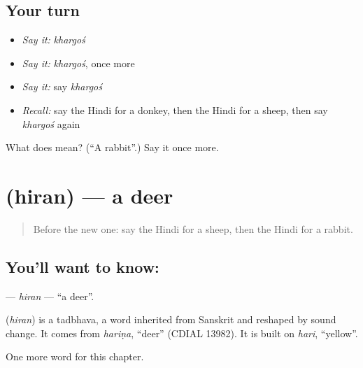 \subsection*{Your turn}
\begin{itemize}
\raggedright
  \item \emph{Say it:} \emph{khargoś}
  \item \emph{Say it:} \emph{khargoś}, once more
  \item \emph{Say it:} say \emph{khargoś}
  \item \emph{Recall:} say the Hindi for a donkey, then the Hindi for a sheep, then say \emph{khargoś} again
\end{itemize}

\begin{tcolorbox}[breakable,colback=teal!4,colframe=teal!35!black,title={Before you move on}]
What does  mean? (\textquotedblleft{}A rabbit\textquotedblright{}.) Say it once more.
\end{tcolorbox}
\section[\texorpdfstring{\hi{हिरन} (hiran)}{हिरन (hiran)}]{ (hiran) — a deer}

\label{lesson:HI-C147-hiran}



\begin{quote}
Before the new one: say the Hindi for a sheep, then the Hindi for a rabbit.
\end{quote}

\subsection*{You'll want to know: }
\textbf{} — \emph{hiran} — \textquotedblleft{}a deer\textquotedblright{}.

\begin{cousinweb}
\textbf{} (\emph{hiran}) is a tadbhava, a word inherited from Sanskrit and reshaped by sound change. It comes from \emph{hariṇa}, \textquotedblleft{}deer\textquotedblright{} (CDIAL 13982). It is built on \emph{hari}, \textquotedblleft{}yellow\textquotedblright{}.
\end{cousinweb}

\begin{grammarlens}[title={What you've built}]
One more word for this chapter.
\end{grammarlens}

